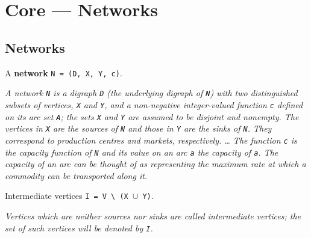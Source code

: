 \section{Core --- Networks}
\subsection{Networks}


\begin{definition}[A network $N = (D, X, Y, c)$]
\label{Networks.Network}
\leanok
A \textbf{network} \texttt{N = (D, X, Y, c)}.

\emph{A network \texttt{N} is a digraph \texttt{D} (the
underlying digraph of \texttt{N}) with two distinguished subsets of vertices, \texttt{X}
and \texttt{Y},
and a non-negative integer-valued function \texttt{c} defined on its arc set \texttt{A};
the sets
\texttt{X} and \texttt{Y} are assumed to be disjoint and nonempty.  The vertices in \texttt{X} are the
sources of \texttt{N} and those in \texttt{Y} are the sinks of \texttt{N}. They
correspond to
production centres and markets, respectively. \dots{} The function \texttt{c} is the
capacity
function of \texttt{N} and its value on an arc \texttt{a} the capacity of \texttt{a}.
The capacity of
an arc can be thought of as representing the maximum rate at which a commodity can
be transported along it.}
\end{definition}

\begin{definition}[Intermediate vertices $I = V \ (X \cup Y)$]
\label{Networks.Network.I}
\leanok
{}
Intermediate vertices \texttt{I = V \textbackslash{} (X $\cup$ Y)}.

\emph{Vertices which are neither sources nor
sinks are called intermediate vertices; the set of such vertices will be denoted by
\texttt{I}.}
\end{definition}


